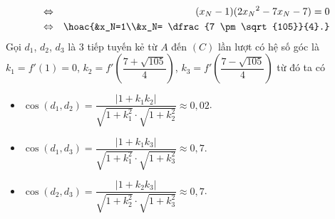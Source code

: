 \begin{ex}
{\begin{itemchoice}
\begin{eqnarray*}
				&\Leftrightarrow& (x_N-1)(2{x_N}^2-7x_N-7) = 0\\
				&\Leftrightarrow& \hoac{&x_N=1\\&x_N= \dfrac{7 \pm \sqrt{105}}{4}.}
			\end{eqnarray*}
			Gọi $d_1$, $d_2$, $d_3$ là $3$ tiếp tuyến kẻ từ $A$ đến $(C)$ lần lượt có hệ số góc là $k_1=f'(1)=0$, $k_2=f'\left(\dfrac{7+ \sqrt{105}}{4}\right)$, $k_3=f'\left(\dfrac{7-\sqrt{105}}{4}\right)$ từ đó ta có
			\begin{itemize}
				\item $\cos (d_1,d_2)=\dfrac{|1+k_1 k_2|}{\sqrt{1+k_1^2} \cdot \sqrt{1+k_2^2}} \approx 0{,}02$.
				\item $\cos (d_1,d_3)=\dfrac{|1+k_1 k_3|}{\sqrt{1+k_1^2} \cdot \sqrt{1+k_3^2}}\approx 0{,}7$.
				\item $\cos (d_2,d_3)=\dfrac{|1+k_2 k_3|}{\sqrt{1+k_2^2} \cdot \sqrt{1+k_3^2}}\approx 0{,}7$.
			\end{itemize}
		\end{itemchoice}
	}
\end{ex}

